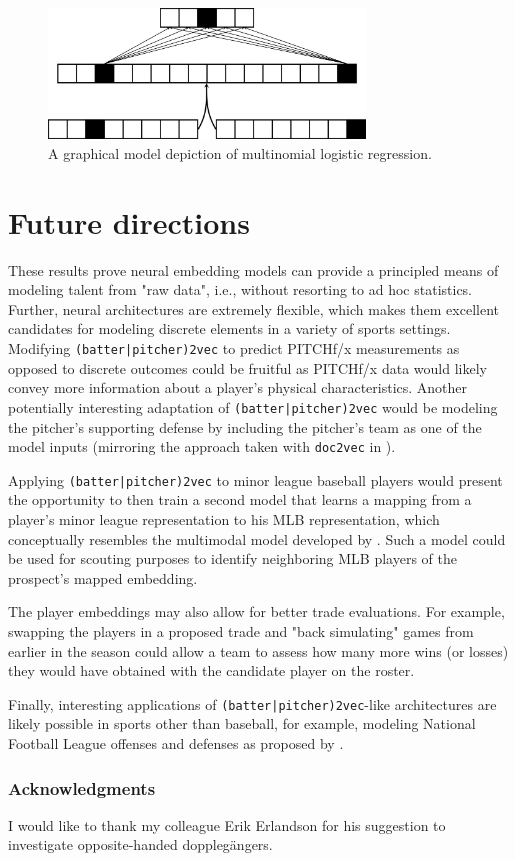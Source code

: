 \documentclass{article}
\begin{document}
\begin{figure}[h]
\centering
\includegraphics[width=0.75\textwidth,height=\textheight,keepaspectratio]{logistic_regression.png}
\caption{A graphical model depiction of multinomial logistic regression.}
\label{fig:log_reg}
\end{figure}

\section{Future directions}
\label{future}

These results prove neural embedding models can provide a principled means of modeling talent from "raw data", i.e., without resorting to ad hoc statistics. Further, neural architectures are extremely flexible, which makes them excellent candidates for modeling discrete elements in a variety of sports settings. Modifying \texttt{(batter|pitcher)2vec} to predict PITCHf/x measurements as opposed to discrete outcomes could be fruitful as PITCHf/x data would likely convey more information about a player's physical characteristics. Another potentially interesting adaptation of \texttt{(batter|pitcher)2vec} would be modeling the pitcher's supporting defense by including the pitcher's team as one of the model inputs (mirroring the approach taken with \texttt{doc2vec} in \parencite{Le2014}).

Applying \texttt{(batter|pitcher)2vec} to minor league baseball players would present the opportunity to then train a second model that learns a mapping from a player's minor league representation to his MLB representation, which conceptually resembles the multimodal model developed by \parencite{Ngiam2011}. Such a model could be used for scouting purposes to identify neighboring MLB players of the prospect's mapped embedding.

The player embeddings may also allow for better trade evaluations. For example, swapping the players in a proposed trade and "back simulating" games from earlier in the season could allow a team to assess how many more wins (or losses) they would have obtained with the candidate player on the roster.

Finally, interesting applications of \texttt{(batter|pitcher)2vec}-like architectures are likely possible in sports other than baseball, for example, modeling National Football League offenses and defenses as proposed by \parencite{Alcorn2016}.

\subsubsection*{Acknowledgments}

I would like to thank my colleague Erik Erlandson for his suggestion to investigate opposite-handed dopplegängers.

\printbibliography
\end{document}

